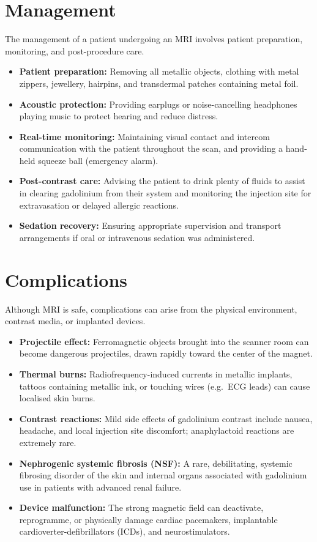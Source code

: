 \section*{Management}
The management of a patient undergoing an MRI involves patient preparation, monitoring, and post-procedure care.
\begin{itemize}
    \item \textbf{Patient preparation:} Removing all metallic objects, clothing with metal zippers, jewellery, hairpins, and transdermal patches containing metal foil.
    \item \textbf{Acoustic protection:} Providing earplugs or noise-cancelling headphones playing music to protect hearing and reduce distress.
    \item \textbf{Real-time monitoring:} Maintaining visual contact and intercom communication with the patient throughout the scan, and providing a hand-held squeeze ball (emergency alarm).
    \item \textbf{Post-contrast care:} Advising the patient to drink plenty of fluids to assist in clearing gadolinium from their system and monitoring the injection site for extravasation or delayed allergic reactions.
    \item \textbf{Sedation recovery:} Ensuring appropriate supervision and transport arrangements if oral or intravenous sedation was administered.
\end{itemize}

\section*{Complications}
Although MRI is safe, complications can arise from the physical environment, contrast media, or implanted devices.
\begin{itemize}
    \item \textbf{Projectile effect:} Ferromagnetic objects brought into the scanner room can become dangerous projectiles, drawn rapidly toward the center of the magnet.
    \item \textbf{Thermal burns:} Radiofrequency-induced currents in metallic implants, tattoos containing metallic ink, or touching wires (e.g.\ ECG leads) can cause localised skin burns.
    \item \textbf{Contrast reactions:} Mild side effects of gadolinium contrast include nausea, headache, and local injection site discomfort; anaphylactoid reactions are extremely rare.
    \item \textbf{Nephrogenic systemic fibrosis (NSF):} A rare, debilitating, systemic fibrosing disorder of the skin and internal organs associated with gadolinium use in patients with advanced renal failure.
    \item \textbf{Device malfunction:} The strong magnetic field can deactivate, reprogramme, or physically damage cardiac pacemakers, implantable cardioverter-defibrillators (ICDs), and neurostimulators.
\end{itemize}


